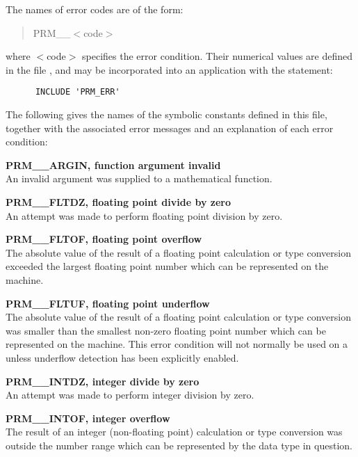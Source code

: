 The names of  error codes are of the form:

\begin{quote}
PRM\_\_$<$code$>$
\end{quote}

where $<$code$>$ specifies the error condition.
Their numerical values are defined in the file , and may be
incorporated into an application with the statement:

\begin{verbatim}
      INCLUDE 'PRM_ERR'
\end{verbatim}

The following gives the names of the symbolic constants defined in this
file, together with the associated error messages and an explanation of each
error condition:

\begin{description}

\item {\bf PRM\_\_ARGIN, function argument invalid}\\
An invalid argument was supplied to a mathematical function.

\item {\bf PRM\_\_FLTDZ, floating point divide by zero}\\
An attempt was made to perform floating point division by zero.

\item {\bf PRM\_\_FLTOF, floating point overflow}\\
The absolute value of the result of a floating point calculation or type
conversion exceeded the largest floating point number which can be
represented on the machine.

\item {\bf PRM\_\_FLTUF, floating point underflow}\\
The absolute value of the result of a floating point calculation or type
conversion was smaller than the smallest non-zero floating point number
which can be represented on the machine.
This error condition will not normally be used on a  unless
underflow detection has been explicitly enabled.

\item {\bf PRM\_\_INTDZ, integer divide by zero}\\
An attempt was made to perform integer division by zero.

\item {\bf PRM\_\_INTOF, integer overflow}\\
The result of an integer (non-floating point) calculation or type conversion
was outside the number range which can be represented by the data type in
question.


\end{description}
